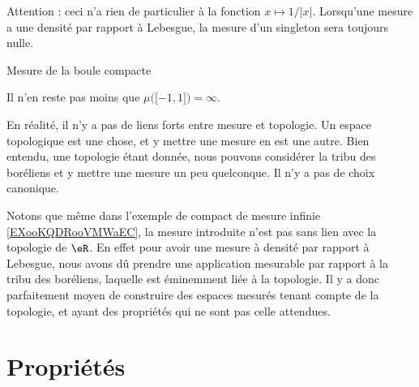 \begin{example}
\begin{subproof}
    Attention : ceci n'a rien de particulier à la fonction \( x\mapsto 1/| x |\). Lorsqu'une mesure a une densité par rapport à Lebesgue, la mesure d'un singleton sera toujours nulle.
    
\item[Mesure de la boule compacte]

    Il n'en reste pas moins que \( \mu\big( \mathopen[ -1 , 1 \mathclose] \big)=\infty\).
        
    \end{subproof}
\end{example}


\begin{normaltext}
     En réalité, il n'y a pas de liens forts entre mesure et topologie. Un espace topologique est une chose, et y mettre une mesure en est une autre. Bien entendu, une topologie étant donnée, nous pouvons considérer la tribu des boréliens et y mettre une mesure un peu quelconque. Il n'y a pas de choix canonique.

     Notons que même dans l'exemple de compact de mesure infinie \ref{EXooKQDRooVMWaEC}, la mesure introduite n'est pas sans lien avec la topologie de \( \eR\). En effet pour avoir une mesure à densité par rapport à Lebesgue, nous avons dû prendre une application mesurable par rapport à la tribu des boréliens, laquelle est éminemment liée à la topologie. Il y a donc parfaitement moyen de construire des espaces mesurés tenant compte de la topologie, et ayant des propriétés qui ne sont pas celle attendues.
\end{normaltext}

\section{Propriétés}

